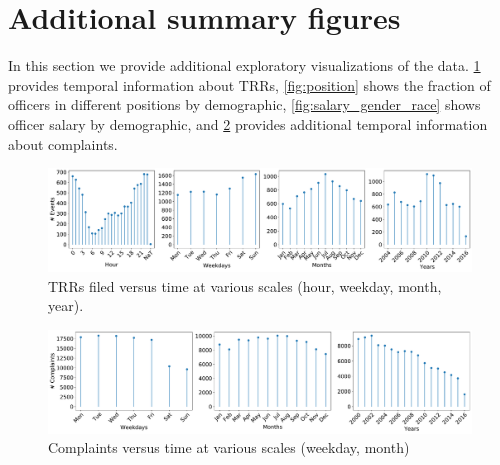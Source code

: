 \section{Additional summary figures}\label{sec:additional_figs}

In this section we provide additional exploratory visualizations 
of the data. \cref{fig:trrs_times} provides temporal information
about TRRs, \cref{fig:position} shows the fraction of officers 
in different positions by demographic, \cref{fig:salary_gender_race}
shows officer salary by demographic, 
and \cref{fig:complaints_times} provides additional temporal information about complaints.

\begin{figure}[t!] 
	\includegraphics[width=\textwidth]{figs/trrs_times} 
	\caption{TRRs filed versus time at various scales (hour, weekday, month, year).} \label{fig:trrs_times}
\end{figure}
\begin{figure}[t!]
	\includegraphics[width=\textwidth, clip, trim= 0 0 460 0]{figs/complaints_times} 
\caption{Complaints versus time at various scales (weekday, month)}\label{fig:complaints_times}
\end{figure}


